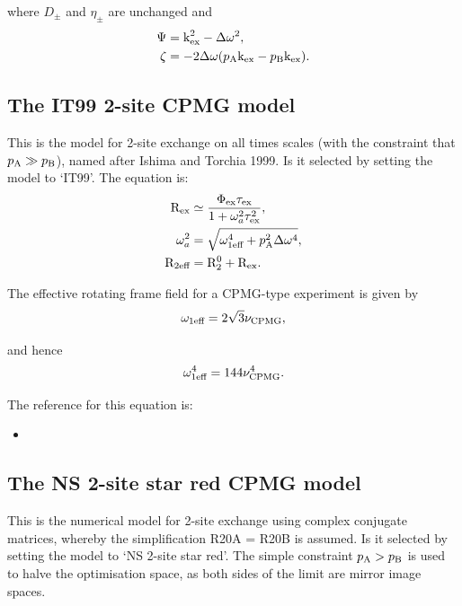 where $D_\pm$ and $\eta_\pm$ are unchanged and
\begin{align}
    \Psi  &= \textrm{k}_\textrm{ex}^2 - \Delta\omega^2 , \\
    \zeta &= -2\Delta\omega (p_\textrm{A}\textrm{k}_\textrm{ex} - p_\textrm{B}\textrm{k}_\textrm{ex}) .
\end{align}




\subsection{The IT99 2-site CPMG model}
\label{sect: dispersion: IT99 model}

This is the model for 2-site exchange on all times scales (with the constraint that $p_\textrm{A} \gg p_\textrm{B}$), named after Ishima and Torchia 1999.  Is it selected by setting the model to `IT99'.  The equation is:
\begin{align}
    \mathrm{R}_\textrm{ex}       &\simeq \frac{\Phi_\textrm{ex}\tau_\textrm{ex}}{1 + \omega_a^2\tau_\textrm{ex}^2} , \\
    \omega_a^2 &= \sqrt{\omega_\textrm{1eff}^4 + p_\textrm{A}^2\Delta\omega^4} , \\
    \mathrm{R}_{2\textrm{eff}}   &= \mathrm{R}_2^0 + \mathrm{R}_\textrm{ex} .
\end{align}

The effective rotating frame field for a CPMG-type experiment is given by
\begin{equation}
    \omega_\textrm{1eff} = 2\sqrt{3}\nu_\textrm{CPMG} ,
\end{equation}

and hence
\begin{equation}
    \omega_\textrm{1eff}^4 = 144\nu_\textrm{CPMG}^4 .
\end{equation}

The reference for this equation is:
\begin{itemize}
\item {}
\end{itemize}



\subsection{The NS 2-site star red CPMG model}
\label{sect: dispersion: NS 2-site star red model}

This is the numerical model for 2-site exchange using complex conjugate matrices, whereby the simplification R20A = R20B is assumed.
Is it selected by setting the model to `NS 2-site star red'.
The simple constraint $p_\textrm{A} > p_\textrm{B}$ is used to halve the optimisation space, as both sides of the limit are mirror image spaces.


